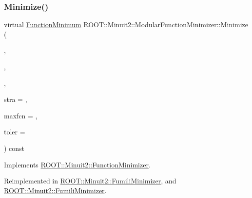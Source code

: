 \subsubsection{\texorpdfstring{Minimize()}{Minimize()}\hspace{0.1cm}{\footnotesize\ttfamily [4/22]}}
{\footnotesize\ttfamily virtual \mbox{\hyperlink{classROOT_1_1Minuit2_1_1FunctionMinimum}{Function\+Minimum}} R\+O\+O\+T\+::\+Minuit2\+::\+Modular\+Function\+Minimizer\+::\+Minimize (\begin{DoxyParamCaption}\item[{const \mbox{\hyperlink{classROOT_1_1Minuit2_1_1FCNGradientBase}{F\+C\+N\+Gradient\+Base}} \&}]{,  }\item[{const std\+::vector$<$ double $>$ \&}]{,  }\item[{const std\+::vector$<$ double $>$ \&}]{,  }\item[{unsigned int}]{stra = {},  }\item[{unsigned int}]{maxfcn = {},  }\item[{double}]{toler = {} }\end{DoxyParamCaption}) const\hspace{0.3cm}{\ttfamily [virtual]}}



Implements \mbox{\hyperlink{classROOT_1_1Minuit2_1_1FunctionMinimizer_ac6063af1cb58f0fd75b16d3cebc49f54}{R\+O\+O\+T\+::\+Minuit2\+::\+Function\+Minimizer}}.



Reimplemented in \mbox{\hyperlink{classROOT_1_1Minuit2_1_1FumiliMinimizer_a2bb7832765e33c24ffad4636ad3b7193}{R\+O\+O\+T\+::\+Minuit2\+::\+Fumili\+Minimizer}}, and \mbox{\hyperlink{classROOT_1_1Minuit2_1_1FumiliMinimizer_a2bb7832765e33c24ffad4636ad3b7193}{R\+O\+O\+T\+::\+Minuit2\+::\+Fumili\+Minimizer}}.

\mbox{\label{classROOT_1_1Minuit2_1_1ModularFunctionMinimizer_ab9a4f3d9f93071d0363ad838c103690d}} 
